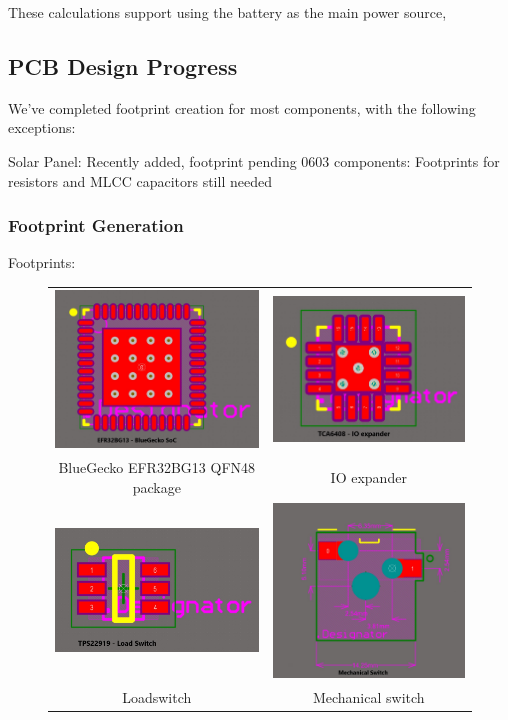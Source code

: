 \documentclass[a4paper,11pt]{article}%
\begin{document}
These calculations support using the battery as the main power source,

\subsection{PCB Design Progress}
We've completed footprint creation for most components, with the following exceptions:

Solar Panel: Recently added, footprint pending
0603 components: Footprints for resistors and MLCC capacitors still needed

\subsubsection{Footprint Generation}
Footprints:

\begin{figure}[H]
    \centering
    \begin{tabular}{cc}
        \includegraphics[width=0.40\linewidth]{figures/BlueGecko.jpg} &
        \includegraphics[width=0.40\linewidth]{figures/IO expander.jpg} \\
        BlueGecko EFR32BG13 QFN48 package & IO expander \\
        
        \includegraphics[width=0.40\linewidth]{figures/Loadswitch.jpg} &
        \includegraphics[width=0.40\linewidth]{figures/Mechanical Switch.jpg} \\
        Loadswitch & Mechanical switch \\
        

\end{tabular}
\end{figure}
\end{document}

